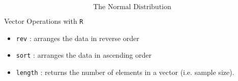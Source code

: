 \documentclass{beamer}
\begin{document}
\begin{frame}
{\huge \[ \mbox{The Normal Distribution}\] }

\end{frame}
\begin{frame}{Vector Operations with \texttt{R}}
{\Large
\begin{itemize}
\item \texttt{rev} : arranges the data in reverse order
\item \texttt{sort} : arranges the data in ascending order
\item \texttt{length} : returns the number of elements in a vector (i.e. sample size).
\end{itemize}
}
\end{frame}

\end{document}
